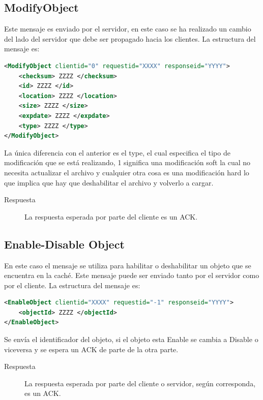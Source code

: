 \subsection{ModifyObject}
Este mensaje es enviado por el servidor, en este caso se ha realizado un cambio del lado del servidor que debe ser propagado hacia los clientes. La estructura del mensaje es:

\begin{lstlisting}[language=XML,caption=Mensaje de ModifyObject]
<ModifyObject clientid="0" requestid="XXXX" responseid="YYYY"> 
	<checksum> ZZZZ </checksum>
	<id> ZZZZ </id>
	<location> ZZZZ </location>
	<size> ZZZZ </size>
	<expdate> ZZZZ </expdate>
	<type> ZZZZ </type>
</ModifyObject>
\end{lstlisting}

La única diferencia con el anterior es el type, el cual especifica el tipo de modificación que se está realizando, 1 significa una modificación soft la cual no necesita actualizar el archivo y cualquier otra cosa es una modificación hard lo que implica que hay que deshabilitar el archivo y volverlo a cargar.

\begin{description}
\item[Respuesta] La respuesta esperada por parte del cliente es un ACK.
\end{description}

\subsection{Enable-Disable Object}

En este caso el mensaje se utiliza para habilitar o deshabilitar un objeto que se encuentra en la caché. Este mensaje puede ser enviado tanto por el servidor como por el cliente. La estructura del mensaje es:

\begin{lstlisting}[language=XML,caption=Mensaje de EnableObject]
<EnableObject clientid="XXXX" requestid="-1" responseid="YYYY"> 
	<objectId> ZZZZ </objectId>
</EnableObject>
\end{lstlisting}

Se envía el identificador del objeto, si el objeto esta Enable se cambia a Disable o viceversa  y se espera un ACK de parte de la otra parte.

\begin{description}
\item[Respuesta] La respuesta esperada por parte del cliente o servidor, según corresponda, es un ACK.
\end{description}

